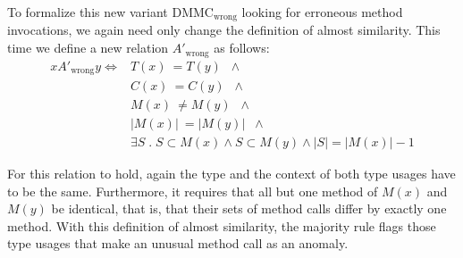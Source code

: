 To formalize this new variant $\text{DMMC}_{\text{wrong}}$ looking for erroneous method invocations, we again need only change the definition of almost similarity.
This time we define a new relation $A'_{\text{wrong}}$ as follows:
\begin{align*}
xA'_{\text{wrong}}y \iff & T(x) \: = T(y) \;\; \land \\
                                & C(x) \: = C(y) \;\; \land \\
                                & M(x) \: \neq M(y) \;\; \land \\
                                & |M(x)| \:  = |M(y)| \;\; \land \\
                                & \exists S \; . \; S \subset M(x) \land S \subset M(y) \land |S| = |M(x)| - 1
\end{align*}

For this relation to hold, again the type and the context of both type usages have to be the same.
Furthermore, it requires that all but one method of $M(x)$ and $M(y)$ be identical, that is, that their sets of method calls differ by exactly one method.
With this definition of almost similarity, the majority rule flags those type usages that make an unusual method call as an anomaly.




